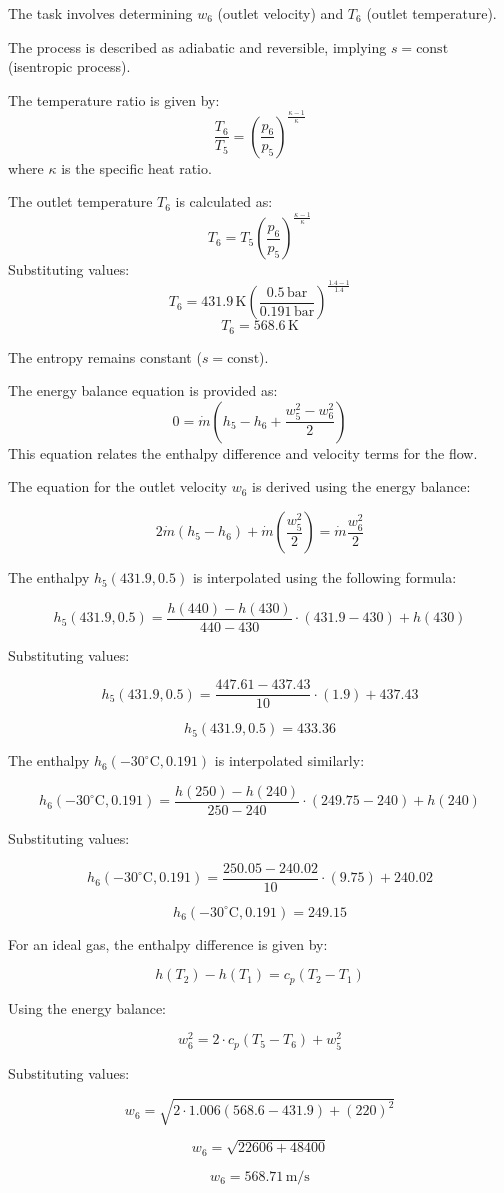 The task involves determining \( w_6 \) (outlet velocity) and \( T_6 \) (outlet temperature).  

The process is described as adiabatic and reversible, implying \( s = \text{const} \) (isentropic process).  

The temperature ratio is given by:  
\[
\frac{T_6}{T_5} = \left( \frac{p_6}{p_5} \right)^{\frac{\kappa - 1}{\kappa}}
\]  
where \( \kappa \) is the specific heat ratio.  

The outlet temperature \( T_6 \) is calculated as:  
\[
T_6 = T_5 \left( \frac{p_6}{p_5} \right)^{\frac{\kappa - 1}{\kappa}}
\]  
Substituting values:  
\[
T_6 = 431.9 \, \text{K} \left( \frac{0.5 \, \text{bar}}{0.191 \, \text{bar}} \right)^{\frac{1.4 - 1}{1.4}}
\]  
\[
T_6 = 568.6 \, \text{K}
\]  

The entropy remains constant (\( s = \text{const} \)).  

The energy balance equation is provided as:  
\[
0 = \dot{m} \left( h_5 - h_6 + \frac{w_5^2 - w_6^2}{2} \right)
\]  
This equation relates the enthalpy difference and velocity terms for the flow.

The equation for the outlet velocity \( w_6 \) is derived using the energy balance:

\[
2 \dot{m} (h_5 - h_6) + \dot{m} \left( \frac{w_5^2}{2} \right) = \dot{m} \frac{w_6^2}{2}
\]

The enthalpy \( h_5(431.9, 0.5) \) is interpolated using the following formula:

\[
h_5(431.9, 0.5) = \frac{h(440) - h(430)}{440 - 430} \cdot (431.9 - 430) + h(430)
\]

Substituting values:

\[
h_5(431.9, 0.5) = \frac{447.61 - 437.43}{10} \cdot (1.9) + 437.43
\]

\[
h_5(431.9, 0.5) = 433.36
\]

The enthalpy \( h_6(-30^\circ\text{C}, 0.191) \) is interpolated similarly:

\[
h_6(-30^\circ\text{C}, 0.191) = \frac{h(250) - h(240)}{250 - 240} \cdot (249.75 - 240) + h(240)
\]

Substituting values:

\[
h_6(-30^\circ\text{C}, 0.191) = \frac{250.05 - 240.02}{10} \cdot (9.75) + 240.02
\]

\[
h_6(-30^\circ\text{C}, 0.191) = 249.15
\]

For an ideal gas, the enthalpy difference is given by:

\[
h(T_2) - h(T_1) = c_p (T_2 - T_1)
\]

Using the energy balance:

\[
w_6^2 = 2 \cdot c_p (T_5 - T_6) + w_5^2
\]

Substituting values:

\[
w_6 = \sqrt{2 \cdot 1.006 (568.6 - 431.9) + (220)^2}
\]

\[
w_6 = \sqrt{22606 + 48400}
\]

\[
w_6 = 568.71 \, \text{m/s}
\]